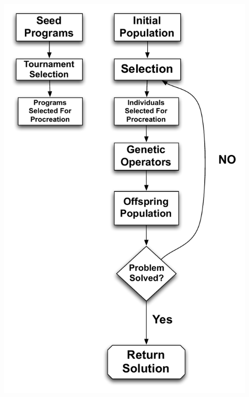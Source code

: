 \documentclass{beamer}
\begin{document}
\begin{frame}
\begin{columns}[T]
\begin{column}{0.5\textwidth}
\begin{itemize}
\end{itemize}
\end{column}
\begin{column}{0.5\textwidth}
   \includegraphics[height=0.85\textheight]{Illustrations/GP2.pdf}
       \\
\end{column}
\end{columns}

\end{frame}
\end{document}
